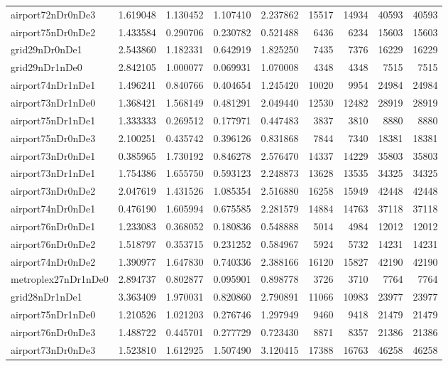 \begin{longtable}{|l|r|r|r|r|r|r|r|r|}
airport72nDr0nDe3 & 1.619048 & 1.130452 & 1.107410 & 2.237862 & 15517 & 14934 & 40593 & 40593 \\
airport75nDr0nDe2 & 1.433584 & 0.290706 & 0.230782 & 0.521488 & 6436 & 6234 & 15603 & 15603 \\
grid29nDr0nDe1 & 2.543860 & 1.182331 & 0.642919 & 1.825250 & 7435 & 7376 & 16229 & 16229 \\
grid29nDr1nDe0 & 2.842105 & 1.000077 & 0.069931 & 1.070008 & 4348 & 4348 & 7515 & 7515 \\
airport74nDr1nDe1 & 1.496241 & 0.840766 & 0.404654 & 1.245420 & 10020 & 9954 & 24984 & 24984 \\
airport73nDr1nDe0 & 1.368421 & 1.568149 & 0.481291 & 2.049440 & 12530 & 12482 & 28919 & 28919 \\
airport75nDr1nDe1 & 1.333333 & 0.269512 & 0.177971 & 0.447483 & 3837 & 3810 & 8880 & 8880 \\
airport75nDr0nDe3 & 2.100251 & 0.435742 & 0.396126 & 0.831868 & 7844 & 7340 & 18381 & 18381 \\
airport73nDr0nDe1 & 0.385965 & 1.730192 & 0.846278 & 2.576470 & 14337 & 14229 & 35803 & 35803 \\
airport73nDr1nDe1 & 1.754386 & 1.655750 & 0.593123 & 2.248873 & 13628 & 13535 & 34325 & 34325 \\
airport73nDr0nDe2 & 2.047619 & 1.431526 & 1.085354 & 2.516880 & 16258 & 15949 & 42448 & 42448 \\
airport74nDr0nDe1 & 0.476190 & 1.605994 & 0.675585 & 2.281579 & 14884 & 14763 & 37118 & 37118 \\
airport76nDr0nDe1 & 1.233083 & 0.368052 & 0.180836 & 0.548888 & 5014 & 4984 & 12012 & 12012 \\
airport76nDr0nDe2 & 1.518797 & 0.353715 & 0.231252 & 0.584967 & 5924 & 5732 & 14231 & 14231 \\
airport74nDr0nDe2 & 1.390977 & 1.647830 & 0.740336 & 2.388166 & 16120 & 15827 & 42190 & 42190 \\
metroplex27nDr1nDe0 & 2.894737 & 0.802877 & 0.095901 & 0.898778 & 3726 & 3710 & 7764 & 7764 \\
grid28nDr1nDe1 & 3.363409 & 1.970031 & 0.820860 & 2.790891 & 11066 & 10983 & 23977 & 23977 \\
airport75nDr1nDe0 & 1.210526 & 1.021203 & 0.276746 & 1.297949 & 9460 & 9418 & 21479 & 21479 \\
airport76nDr0nDe3 & 1.488722 & 0.445701 & 0.277729 & 0.723430 & 8871 & 8357 & 21386 & 21386 \\
airport73nDr0nDe3 & 1.523810 & 1.612925 & 1.507490 & 3.120415 & 17388 & 16763 & 46258 & 46258 \\

\end{longtable}
